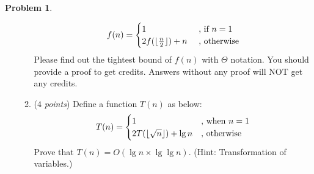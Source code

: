 \documentclass[12pt,a4paper]{report}
\newcommand{\points}[1]{ ($#1$ \textit{points}) }
\theoremstyle{definition}
\newtheorem{problem}{\textbf{Problem}}
\theoremstyle{definition}
\DeclarePairedDelimiter\floor{\lfloor}{\rfloor}
\begin{document}
\begin{problem}
\begin{enumerate}[label=\arabic*.]
\begin{enumerate}[label=\alph*.]
\begin{equation*}
        f(n) = 
               \begin{cases}
               1 &\text{ , if } n = 1\\
               2f(\floor{\frac{n}{2}}) + n &\text{ , otherwise}
               \end{cases}
        \end{equation*}
    Please find out the tightest bound of $f(n)$ with $\Theta$ notation.
    You should provide a proof to get credits.
    Answers without any proof will NOT get any credits.
    \item \points{4}Define a function $T(n)$ as below:
        \begin{equation*}
        T(n) = 
               \begin{cases}
               1 &\text{, when } n = 1\\
               2T(\floor{\sqrt{n}}) + \lg n &\text{, otherwise}
               \end{cases}
        \end{equation*}
    Prove that $T(n) = O(\lg n \times \lg\lg n)$.
    (Hint: Transformation of variables.)
    \end{enumerate}



\end{enumerate}


\end{problem}

\newpage
\end{document}
